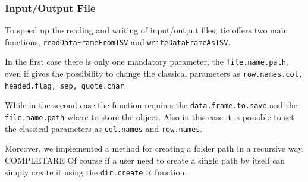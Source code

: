 \subsubsection*{Input/Output File}

To speed up the reading and writing of input/output files, \gls{tic} offers two main functions, \lstinline!readDataFrameFromTSV! and \lstinline!writeDataFrameAsTSV!.

In the first case there is only one mandatory parameter, the \lstinline!file.name.path!, even if gives the possibility to change the classical parameters as \lstinline!row.names.col, headed.flag, sep, quote.char!.

While in the second case the function requires the \lstinline!data.frame.to.save! and the \lstinline!file.name.path! where to store the object. 
Also in this case it is possible to set the classical parameters as \lstinline!col.names! and \lstinline!row.names!.

Moreover, we implemented a method for creating a folder path in a recursive way.
COMPLETARE
Of course if a user need to create a single path by itself can simply create it using the \lstinline!dir.create! R function.
